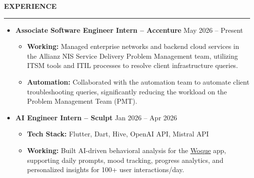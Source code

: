 \documentclass[10pt]{article}
\newcommand{\resheading}[1]{\vspace{6pt} \noindent \textbf{\large\scshape{#1}} \vspace{3pt} \hrule \vspace{4pt}}
\begin{document}
\resheading{EXPERIENCE}
\begin{itemize}
\item \textbf{Associate Software Engineer Intern -- Accenture} \hfill May 2026 -- Present
    \begin{itemize}[noitemsep]
        \item \textbf{Working:} Managed enterprise networks and backend cloud services in the Allianz NIS Service Delivery Problem Management team, utilizing ITSM tools and ITIL processes to resolve client infrastructure queries.
        \item \textbf{Automation:} Collaborated with the automation team to automate client troubleshooting queries, significantly reducing the workload on the Problem Management Team (PMT).
    \end{itemize}
\item \textbf{AI Engineer Intern -- Sculpt} \hfill Jan 2026 -- Apr 2026
    \begin{itemize}[noitemsep]
        \item \textbf{Tech Stack:} Flutter, Dart, Hive, OpenAI API, Mistral API
        \item \textbf{Working:} Built AI-driven behavioral analysis for the \href{https://github.com/arijitpaull/woque}{Woque} app, supporting daily prompts, mood tracking, progress analytics, and personalized insights for 100+ user interactions/day.
    \end{itemize}
\end{itemize}
\end{document}

